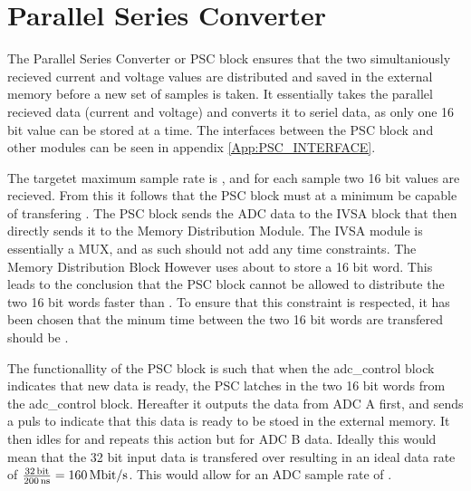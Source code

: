 \section{Parallel Series Converter} \label{subsec:PSC}
The Parallel Series Converter or PSC block ensures that the two simultaniously recieved current and voltage values are distributed and saved in the external memory before a new set of samples is taken. It essentially takes the parallel recieved data (current and voltage) and converts it to seriel data, as only one 16 bit value can be stored at a time. The interfaces between the PSC block and other modules can be seen in appendix \ref{App:PSC_INTERFACE}.

The targetet maximum sample rate is , and for each sample two 16 bit values are recieved. From this it follows that the PSC block must at a minimum be capable of transfering . The PSC block sends the ADC data to the IVSA block that then directly sends it to the Memory Distribution Module. The IVSA module is essentially a MUX, and as such should not add any time constraints. The Memory Distribution Block However uses about  to store a 16 bit word. This leads to the conclusion that the PSC block cannot be allowed to distribute the two 16 bit words faster than . To ensure that this constraint is respected, it has been chosen that the minum time between the two 16 bit words are transfered should be .

The functionallity of the PSC block is such that when the adc\_control block indicates that new data is ready, the PSC latches in the two 16 bit words from the adc\_control block. Hereafter it outputs the data from ADC A first, and sends a puls to indicate that this data is ready to be stoed in the external memory. It then idles for  and repeats this action but for ADC B data. Ideally this would mean that the 32 bit input data is transfered over  resulting in an ideal data rate of $\frac{\SIQ{32}{\bit}}{\SIQ{200}{\nano\second}} = \SIQ{160}{\mega\bit/\second}$. This would allow for an ADC sample rate of .

